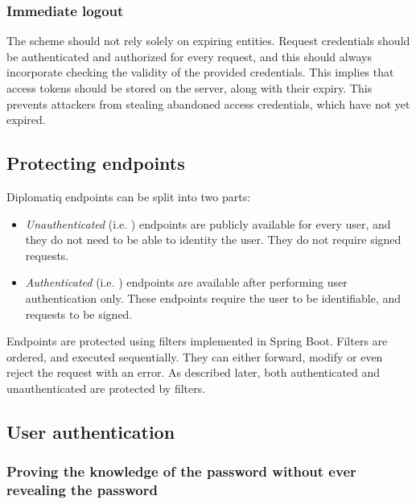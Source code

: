 \subsubsection{Immediate logout}

The scheme should not rely solely on expiring entities. Request credentials should be authenticated and authorized for every request, and this should always incorporate checking the validity of the provided credentials. This implies that access tokens should be stored on the server, along with their expiry. This prevents attackers from stealing abandoned access credentials, which have not yet expired.

\subsection{Protecting endpoints}

Diplomatiq endpoints can be split into two parts:

\begin{itemize}
\item \emph{Unauthenticated} (i.e. ) endpoints are publicly available for every user, and they do not need to be able to identity the user. They do not require signed requests.
\item \emph{Authenticated} (i.e. ) endpoints are available after performing user authentication only. These endpoints require the user to be identifiable, and requests to be signed.
\end{itemize}

Endpoints are protected using filters implemented in Spring Boot. Filters are ordered, and executed sequentially. They can either forward, modify or even reject the request with an error. As described later, both authenticated and unauthenticated are protected by filters.

\subsection{User authentication}

\subsubsection{Proving the knowledge of the password without ever revealing the password}


